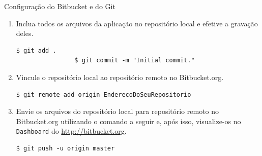 \begin{frame}{Configuração do Bitbucket e do Git}
\begin{enumerate}
			\item Inclua todos os arquivos da aplicação no repositório local e efetive 
			a gravação deles.
			\begin{lstlisting}[style=BashInputStyle]
				$ git add .
				$ git commit -m "Initial commit."
			\end{lstlisting}
			
			\item Vincule o repositório local ao repositório remoto no Bitbucket.org.
			\begin{lstlisting}[style=BashInputStyle]
				$ git remote add origin EnderecoDoSeuRepositorio
			\end{lstlisting}
			
			\item Envie os arquivos do repositório local para repositório remoto no Bitbucket.org utilizando
			o comando a seguir e, após isso, visualize-os no \verb!Dashboard! do \url{http://bitbucket.org}.
			\begin{lstlisting}[style=BashInputStyle]
				$ git push -u origin master
			\end{lstlisting}
			
  \end{enumerate}
\end{frame}
